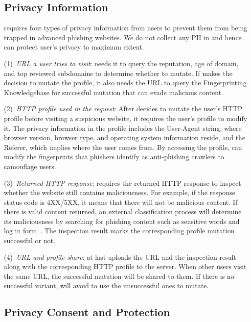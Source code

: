 \subsection{Privacy Information}

\spartacus requires four types of privacy information from users to prevent them from being trapped in advanced phishing websites.
We do not collect any PII in \spartacus and hence can protect user's privacy to maximum extent.

(1)~\emph{URL a user tries to visit}: \spartacus needs it to query the reputation, age of domain, and top reviewed subdomains to determine whether to mutate.
If \spartacus makes the decision to mutate the profile, it also needs the URL to query the Fingerprinting Knowledgebase for successful mutation that can evade malicious content.

(2)~\emph{HTTP profile used in the request}:
After \spartacus decides to mutate the user's HTTP profile before visiting a suspicious website, it requires the user's profile to modify it.
The privacy information in the profile includes the User-Agent string, where browser version, browser type, and operating system information reside, and the Referer, which implies where the user comes from.
By accessing the profile, \spartacus can modify the fingerprints that phishers identify as anti-phishing crawlers to camouflage users.

(3)~\emph{Returned HTTP response}:
\spartacus requires the returned HTTP response to inspect whether the website still contains maliciousness.
For example, if the response status code is 4XX/5XX, it means that there will not be malicious content.
If there is valid content returned,
an external classification process will determine its maliciousness by searching for phishing content such as sensitive words and log in form~\cite{xiang2011cantina+}.
The inspection result marks the corresponding profile mutation successful or not.

(4)~\emph{URL and profile share}:
\spartacus at last uploads the URL and the inspection result along with the corresponding HTTP profile to the server.
When other users visit the same URL, the successful mutation will be shared to them.
If there is no successful variant, \spartacus will avoid to use the unsuccessful ones to mutate.


\subsection{Privacy Consent and Protection}

